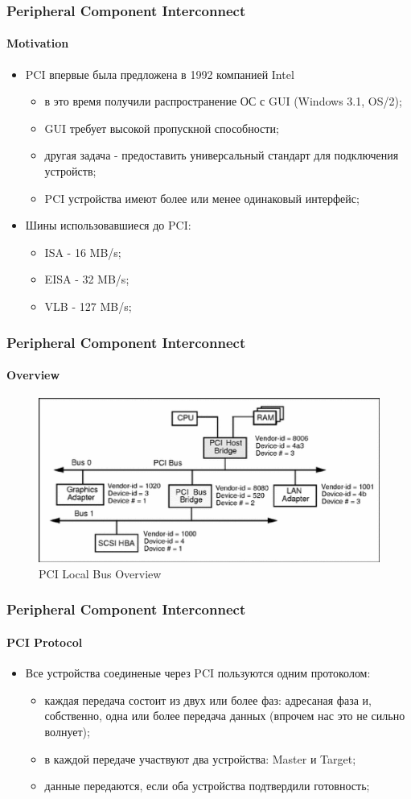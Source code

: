 \begin{frame}
\frametitle{Peripheral Component Interconnect}
\framesubtitle{Motivation}
\begin{itemize}
  \item<1-> PCI впервые была предложена в 1992 компанией Intel
    \begin{itemize}
      \item в это время получили распространение ОС с GUI (Windows 3.1, OS/2);
      \item GUI требует высокой пропускной способности;
      \item другая задача - предоставить универсальный стандарт для подключения
            устройств;
      \item PCI устройства имеют более или менее одинаковый интерфейс;
    \end{itemize}
  \item<2-> Шины использовавшиеся до PCI:
    \begin{itemize}
      \item ISA - 16 MB/s;
      \item EISA - 32 MB/s;
      \item VLB - 127 MB/s;
    \end{itemize}
\end{itemize}
\end{frame}

\begin{frame}
\frametitle{Peripheral Component Interconnect}
\framesubtitle{Overview}
\begin{figure}
  \centering\includegraphics[width=.8\linewidth]{pci}
  \caption{PCI Local Bus Overview}
\end{figure}
\end{frame}

\begin{frame}
\frametitle{Peripheral Component Interconnect}
\framesubtitle{PCI Protocol}
\begin{itemize}
  \item Все устройства соединеные через PCI пользуются одним протоколом:
    \begin{itemize}
      \item каждая передача состоит из двух или более фаз: адресаная фаза и,
            собственно, одна или более передача данных (впрочем нас это не
            сильно волнует);
      \item в каждой передаче участвуют два устройства: Master и Target;
      \item данные передаются, если оба устройства подтвердили готовность;
    \end{itemize}
\end{itemize}
\end{frame}

